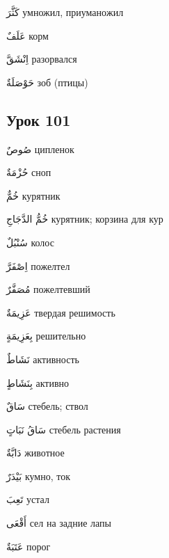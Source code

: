 \documentclass[a5paper]{article}
\newcommand\textstyleDropCaps[1]{#1}
\newcommand\textstyleCaptioncharacters[1]{#1}
\begin{document}
\textstyleCaptioncharacters{كَثَّرَ }\textstyleDropCaps{умножил, приумано­жил‎}

\textstyleCaptioncharacters{عَلَفٌ }\textstyleDropCaps{корм‎}

\textstyleCaptioncharacters{اِنْشَقَّ }\textstyleDropCaps{разорвался‎}

\textstyleCaptioncharacters{حَوْصَلَةٌ }\textstyleDropCaps{зоб (птицы)‎}

\subsection[Урок 101‎]{\textstyleDropCaps{Урок 101‎}}
\textstyleCaptioncharacters{صُوصٌ }\textstyleDropCaps{ципленок‎}

\textstyleCaptioncharacters{حُزْمَةٌ }\textstyleDropCaps{сноп‎}

\textstyleCaptioncharacters{خُمٌّ }\textstyleDropCaps{курятник‎}

\textstyleCaptioncharacters{خُمُّ الدَّجَاجِ }\textstyleDropCaps{курятник; корзина для кур‎}

\textstyleCaptioncharacters{سُنْبُلٌ }\textstyleDropCaps{колос‎}

\textstyleCaptioncharacters{اِصْفَرَّ }\textstyleDropCaps{пожелтел‎}

\textstyleCaptioncharacters{مُصَفَّرٌ }\textstyleDropCaps{пожелтевший‎}

\textstyleCaptioncharacters{عَزِيمَةٌ }\textstyleDropCaps{твердая реши­мость‎}

\textstyleCaptioncharacters{بِعَزِيمَةٍ }\textstyleDropCaps{решительно‎}

\textstyleCaptioncharacters{نَشَاطٌ }\textstyleDropCaps{активность‎}

\textstyleCaptioncharacters{بِنَشَاطٍ }\textstyleDropCaps{активно‎}

\textstyleCaptioncharacters{سَاقٌ }\textstyleDropCaps{стебель; ствол‎}

\textstyleCaptioncharacters{سَاقُ نَبَاتٍ }\textstyleDropCaps{стебель рас­тения‎}

\textstyleCaptioncharacters{دَابَّةٌ }\textstyleDropCaps{животное‎}

\textstyleCaptioncharacters{بَيْدَرٌ }\textstyleDropCaps{кумно, ток‎}

\textstyleCaptioncharacters{تَعِبَ }\textstyleDropCaps{устал‎}

\textstyleCaptioncharacters{أَقْعَى }\textstyleDropCaps{сел на задние лапы‎}

\textstyleCaptioncharacters{عَتَبَةٌ }\textstyleDropCaps{порог‎}
\end{document}
